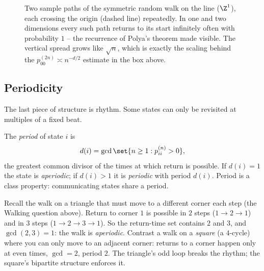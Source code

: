 \begin{figure}[H]
\centering
{}
\caption{Two sample paths of the symmetric random walk on the line ($\Z^1$), each crossing
the origin (dashed line) repeatedly. In one and two dimensions every such path returns to its
start infinitely often with probability $1$ -- the recurrence of Polya's theorem made visible.
The vertical spread grows like $\sqrt{n}$, which is exactly the scaling behind the
$p_{00}^{(2n)} \asymp n^{-d/2}$ estimate in the box above.}
\label{ch23:fig-rw-paths}
\end{figure}

\subsection{Periodicity}

The last piece of structure is rhythm. Some states can only be revisited at multiples of a
fixed beat.

\begin{definition}[Period]
\label{ch23:def-period}
The \emph{period} of state $i$ is
\[
  d(i) = \gcd\set{ n \ge 1 : p_{ii}^{(n)} > 0 },
\]
the greatest common divisor of the times at which return is possible. If $d(i) = 1$ the state
is \emph{aperiodic}; if $d(i) > 1$ it is \emph{periodic} with period $d(i)$. Period is a class
property: communicating states share a period.
\end{definition}

\begin{example}
\label{ch23:ex-triangle-period}
Recall the walk on a triangle that must move to a different corner each step (the Walking
question above). Return to corner $1$ is possible in $2$ steps ($1\to2\to1$) and in $3$ steps
($1\to2\to3\to1$). So the return-time set contains $2$ and $3$, and $\gcd(2,3) = 1$: the walk
is \emph{aperiodic}. Contrast a walk on a \emph{square} (a $4$-cycle) where you can only move
to an adjacent corner: returns to a corner happen only at even times, $\gcd = 2$, period $2$.
The triangle's odd loop breaks the rhythm; the square's bipartite structure enforces it.
\end{example}

